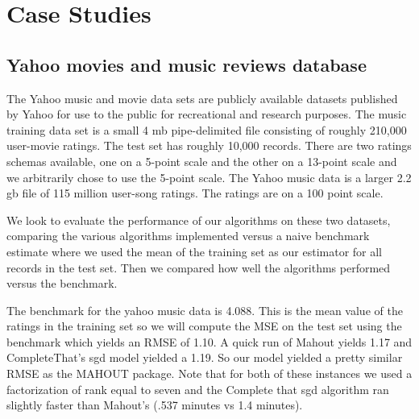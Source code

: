 \documentclass[12pt]{article}
\begin{document}
\section{Case Studies}
\subsection*{Yahoo movies and music reviews database}
The Yahoo music and movie data sets are publicly available datasets published by Yahoo for use to the public for recreational and research purposes. The music training data set is a small 4 mb pipe-delimited file consisting of roughly 210,000 user-movie ratings. The test set has roughly 10,000 records. There are two ratings schemas available, one on a 5-point scale and the other on a 13-point scale and we arbitrarily chose to use the 5-point scale. The Yahoo music data is a larger 2.2 gb file of 115 million user-song ratings. The ratings are on a 100 point scale.
 
We look to evaluate the performance of our algorithms on these two datasets, comparing the various algorithms implemented versus a naive benchmark estimate where we used the mean of the training set as our estimator for all records in the test set. Then we compared how well the algorithms performed versus the benchmark. 

The benchmark for the yahoo music data is 4.088. This is the mean value of the ratings in the training set so we will compute the MSE on the test set using the benchmark which yields an RMSE of 1.10. A quick run of Mahout yields 1.17 and CompleteThat's sgd model yielded a 1.19. So our model yielded a pretty similar RMSE as the MAHOUT package. Note that for both of these instances we used a factorization of rank equal to seven and the Complete that sgd algorithm ran slightly faster than Mahout's (.537 minutes vs 1.4 minutes). 
\end{document}
